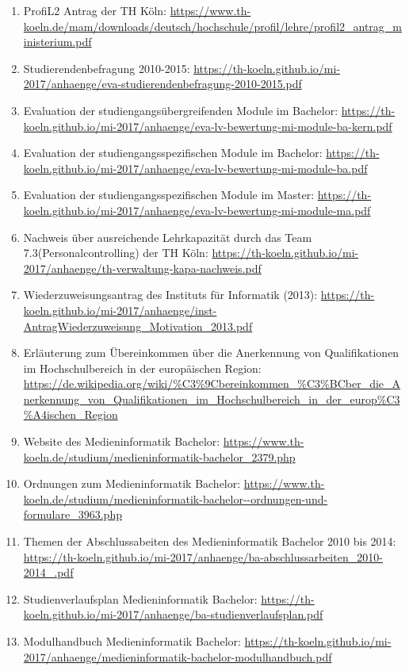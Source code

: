 \documentclass[BCOR12mm,DIV11,titlepage,a4paper,oneside,10pt]{scrbook}
\begin{document}
\begin{sloppypar}
\begin{flushleft}
\begin{enumerate}
\item{ProfiL2 Antrag der TH Köln: \url{https://www.th-koeln.de/mam/downloads/deutsch/hochschule/profil/lehre/profil2\_antrag\_ministerium.pdf} } 
\item{Studierendenbefragung 2010-2015: \url{https://th-koeln.github.io/mi-2017/anhaenge/eva-studierendenbefragung-2010-2015.pdf} } 
\item{Evaluation der studiengangsübergreifenden Module im Bachelor: \url{https://th-koeln.github.io/mi-2017/anhaenge/eva-lv-bewertung-mi-module-ba-kern.pdf} } 
\item{Evaluation der studiengangsspezifischen Module im Bachelor: \url{https://th-koeln.github.io/mi-2017/anhaenge/eva-lv-bewertung-mi-module-ba.pdf} } 
\item{Evaluation der studiengangsspezifischen Module im Master: \url{https://th-koeln.github.io/mi-2017/anhaenge/eva-lv-bewertung-mi-module-ma.pdf} } 
\item{Nachweis über ausreichende Lehrkapazität durch das Team 7.3(Personalcontrolling) der TH Köln: \url{https://th-koeln.github.io/mi-2017/anhaenge/th-verwaltung-kapa-nachweis.pdf} } 
\item{Wiederzuweisungsantrag des Instituts für Informatik (2013): \url{https://th-koeln.github.io/mi-2017/anhaenge/inst-AntragWiederzuweisung\_Motivation\_2013.pdf} } 
\item{Erläuterung zum Übereinkommen über die Anerkennung von Qualifikationen im Hochschulbereich in der europäischen Region: \url{https://de.wikipedia.org/wiki/\%C3\%9Cbereinkommen\_\%C3\%BCber\_die\_Anerkennung\_von\_Qualifikationen\_im\_Hochschulbereich\_in\_der\_europ\%C3\%A4ischen\_Region} } 
\item{Website des Medieninformatik Bachelor: \url{https://www.th-koeln.de/studium/medieninformatik-bachelor\_2379.php} } 
\item{Ordnungen zum Medieninformatik Bachelor: \url{https://www.th-koeln.de/studium/medieninformatik-bachelor--ordnungen-und-formulare\_3963.php} } 
\item{Themen der Abschlussabeiten des Medieninformatik Bachelor 2010 bis 2014: \url{https://th-koeln.github.io/mi-2017/anhaenge/ba-abschlussarbeiten\_2010-2014\_.pdf} } 
\item{Studienverlaufsplan Medieninformatik Bachelor: \url{https://th-koeln.github.io/mi-2017/anhaenge/ba-studienverlaufsplan.pdf} } 
\item{Modulhandbuch Medieninformatik Bachelor: \url{https://th-koeln.github.io/mi-2017/anhaenge/medieninformatik-bachelor-modulhandbuch.pdf} } 

\end{enumerate}
\end{flushleft}
\end{sloppypar}
\end{document}
